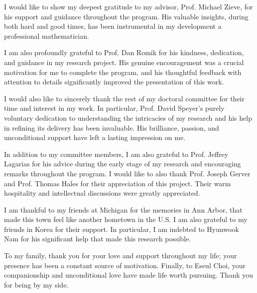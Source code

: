 I would like to show my deepest gratitude to my advisor, Prof. Michael Zieve,
for his support and guidance throughout the program.
His valuable insights, during both hard and good times,
has been instrumental in my development a professional mathematician.

I am also profoundly grateful to Prof. Dan Romik for his kindness, dedication, 
and guidance in my research project.
His genuine encouragement was a crucial motivation for me to complete the program,
and his thoughtful feedback with attention to details
significantly improved the presentation of this work.

I would also like to sincerely thank the rest of my doctoral committee for their time and interest in my work.
In particular, Prof. David Speyer's purely voluntary dedication to understanding the intricacies of my research and 
his help in refining its delivery has been invaluable.
His brilliance, passion, and unconditional support have left a lasting impression on me.

In addition to my committee members,
I am also grateful to Prof. Jeffrey Lagarias for his advice during the early stage of my research
and encouraging remarks throughout the program.
I would like to also thank Prof. Joseph Gerver and Prof. Thomas Hales for their appreciation of this project.
Their warm hospitality and intellectual discussions were greatly appreciated.

I am thankful to my friends at Michigan for the memories in Ann Arbor,
that made this town feel like another hometown in the U.S.
I am also grateful to my friends in Korea for their support.
In particular, I am indebted to Hyunwook Nam for his significant help that
made this research possible. 

To my family, thank you for your love and support throughout my life;
your presence has been a constant source of motivation.
Finally, to Eseul Choi, 
your companionship and unconditional love have made life worth pursuing.
Thank you for being by my side.